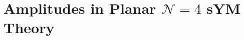 \documentclass[11pt]{article}
\begin{document}
 






\section{Amplitudes in Planar $\mathcal{N}=4$ sYM Theory}
\label{sec:amplitudes_review}
\end{document}
